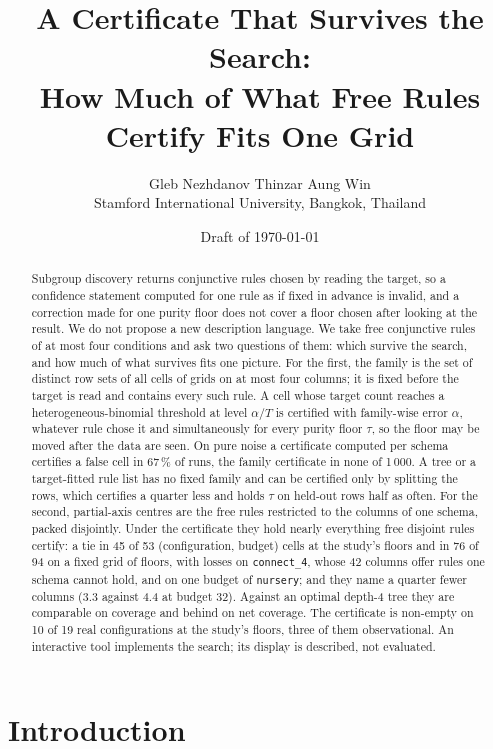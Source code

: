 \documentclass[11pt]{article}
\title{A Certificate That Survives the Search:\\
How Much of What Free Rules Certify Fits One Grid}
\author{Gleb Nezhdanov \quad Thinzar Aung Win\\[3pt]
\normalsize Stamford International University, Bangkok, Thailand}
\date{Draft of \today}
\begin{document}
\maketitle

\begin{abstract}
Subgroup discovery returns conjunctive rules chosen by reading the target, so a confidence statement computed for one rule as if fixed in advance is invalid, and a correction made for one purity floor does not cover a floor chosen after looking at the result. We do not propose a new description language. We take free conjunctive rules of at most four conditions and ask two questions of them: which survive the search, and how much of what survives fits one picture. For the first, the family is the set of distinct row sets of all cells of grids on at most four columns; it is fixed before the target is read and contains every such rule. A cell whose target count reaches a heterogeneous-binomial threshold at level $\alpha/T$ is certified with family-wise error $\alpha$, whatever rule chose it and simultaneously for every purity floor $\tau$, so the floor may be moved after the data are seen. On pure noise a certificate computed per schema certifies a false cell in 67\,\% of runs, the family certificate in none of 1\,000. A tree or a target-fitted rule list has no fixed family and can be certified only by splitting the rows, which certifies a quarter less and holds $\tau$ on held-out rows half as often. For the second, partial-axis centres are the free rules restricted to the columns of one schema, packed disjointly. Under the certificate they hold nearly everything free disjoint rules certify: a tie in 45 of 53 (configuration, budget) cells at the study's floors and in 76 of 94 on a fixed grid of floors, with losses on \texttt{connect\_4}, whose 42 columns offer rules one schema cannot hold, and on one budget of \texttt{nursery}; and they name a quarter fewer columns (3.3 against 4.4 at budget 32). Against an optimal depth-4 tree they are comparable on coverage and behind on net coverage. The certificate is non-empty on 10 of 19 real configurations at the study's floors, three of them observational. An interactive tool implements the search; its display is described, not evaluated.
\end{abstract}

\section{Introduction}
\end{document}
